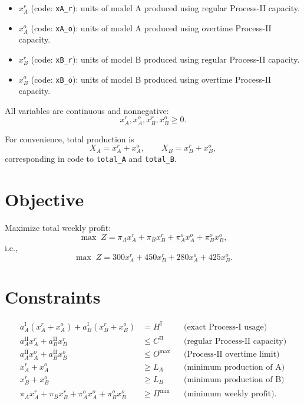 \begin{itemize}
    \item $x^r_A$ (code: \texttt{xA\_r}): units of model A produced using regular Process-II capacity.
    \item $x^o_A$ (code: \texttt{xA\_o}): units of model A produced using overtime Process-II capacity.
    \item $x^r_B$ (code: \texttt{xB\_r}): units of model B produced using regular Process-II capacity.
    \item $x^o_B$ (code: \texttt{xB\_o}): units of model B produced using overtime Process-II capacity.
\end{itemize}

All variables are continuous and nonnegative:
\[
x^r_A, x^o_A, x^r_B, x^o_B \ge 0.
\]

For convenience, total production is
\[
X_A = x^r_A + x^o_A, \qquad X_B = x^r_B + x^o_B,
\]
corresponding in code to \texttt{total\_A} and \texttt{total\_B}.

\section*{Objective}

Maximize total weekly profit:
\[
\max \; Z
=
\pi_A x^r_A + \pi_B x^r_B + \pi^o_A x^o_A + \pi^o_B x^o_B,
\]
i.e.,
\[
\max \; Z
=
300x^r_A + 450x^r_B + 280x^o_A + 425x^o_B.
\]

\section*{Constraints}

\begin{align}
a^{\mathrm{I}}_A (x^r_A + x^o_A) + a^{\mathrm{I}}_B (x^r_B + x^o_B) &= H^{\mathrm{I}}
&& \text{(exact Process-I usage)} \\
a^{\mathrm{II}}_A x^r_A + a^{\mathrm{II}}_B x^r_B &\le C^{\mathrm{II}}
&& \text{(regular Process-II capacity)} \\
a^{\mathrm{II}}_A x^o_A + a^{\mathrm{II}}_B x^o_B &\le O^{\max}
&& \text{(Process-II overtime limit)} \\
x^r_A + x^o_A &\ge L_A
&& \text{(minimum production of A)} \\
x^r_B + x^o_B &\ge L_B
&& \text{(minimum production of B)} \\
\pi_A x^r_A + \pi_B x^r_B + \pi^o_A x^o_A + \pi^o_B x^o_B &\ge \Pi^{\min}
&& \text{(minimum weekly profit).}
\end{align}

